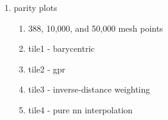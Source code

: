 \documentclass[preprint,12pt]{elsarticle}
\begin{document}

\begin{enumerate}
    \item parity plots
    \begin{enumerate}
        \item 388, 10,000, and 50,000 mesh points
        \item tile1 - barycentric
        \item tile2 - \gls{gpr}
        \item tile3 - inverse-distance weighting
        \item tile4 - pure \gls{nn} interpolation
    \end{enumerate}


\end{enumerate}
\end{document}
